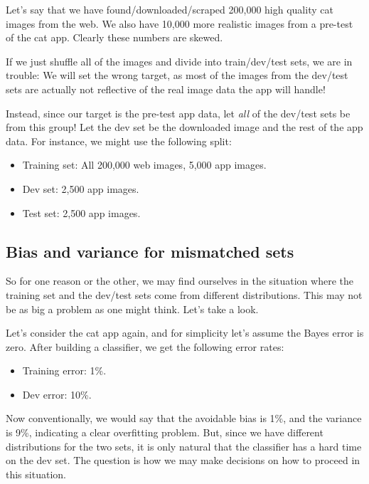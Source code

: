 \documentclass[12pt, a4paper]{article}
\numberwithin{equation}{section}
\begin{document}
Let's say that we have found/downloaded/scraped 200,000 high quality cat images from the web. We also have 10,000 more realistic images from a pre-test of the cat app. Clearly these numbers are skewed.

If we just shuffle all of the images and divide into train/dev/test sets, we are in trouble: We will set the wrong target, as most of the images from the dev/test sets are actually not reflective of the real image data the app will handle!

Instead, since our target is the pre-test app data, let \emph{all} of the dev/test sets be from this group! Let the dev set be the downloaded image and the rest of the app data. For instance, we might use the following split:
\begin{itemize}
\item Training set: All 200,000 web images, 5,000 app images.
\item Dev set: 2,500 app images.
\item Test set: 2,500 app images.
\end{itemize} 

\subsection{Bias and variance for mismatched sets}
So for one reason or the other, we may find ourselves in the situation where the training set and the dev/test sets come from different distributions. This may not be as big a problem as one might think. Let's take a look.

Let's consider the cat app again, and for simplicity let's assume the Bayes error is zero. After building a classifier, we get the following error rates:
\begin{itemize}
\item Training error: 1\%.
\item Dev error: 10\%.
\end{itemize}
Now conventionally, we would say that the avoidable bias is 1\%, and the variance is 9\%, indicating a clear overfitting problem. But, since we have different distributions for the two sets, it is only natural that the classifier has a hard time on the dev set. The question is how we may make decisions on how to proceed in this situation.
\end{document}
